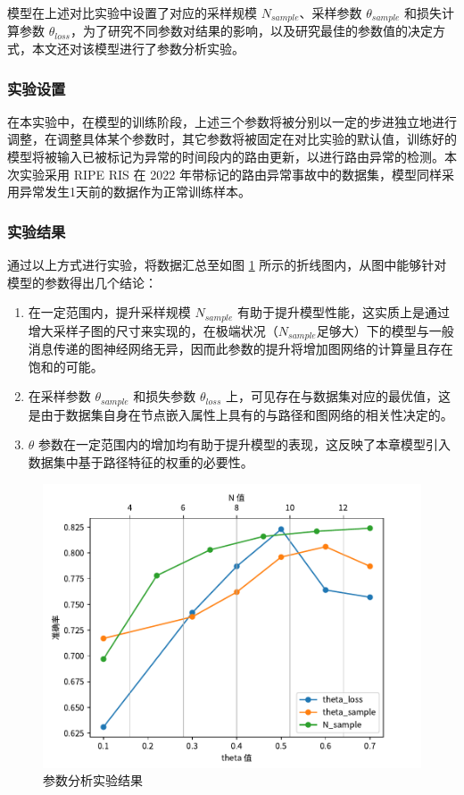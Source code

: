 模型在上述对比实验中设置了对应的采样规模 $N_{sample}$、采样参数 $\theta_{sample}$ 和损失计算参数 $\theta_{loss}$，为了研究不同参数对结果的影响，以及研究最佳的参数值的决定方式，本文还对该模型进行了参数分析实验。

\subsubsection{实验设置}

在本实验中，在模型的训练阶段，上述三个参数将被分别以一定的步进独立地进行调整，在调整具体某个参数时，其它参数将被固定在对比实验的默认值，训练好的模型将被输入已被标记为异常的时间段内的路由更新，以进行路由异常的检测。本次实验采用 RIPE RIS 在 2022 年带标记的路由异常事故中的数据集，模型同样采用异常发生1天前的数据作为正常训练样本。

\subsubsection{实验结果}

通过以上方式进行实验，将数据汇总至如图 \ref{c4_arg-result} 所示的折线图内，从图中能够针对模型的参数得出几个结论：

\begin{enumerate}
    \item 在一定范围内，提升采样规模 $N_{sample}$ 有助于提升模型性能，这实质上是通过增大采样子图的尺寸来实现的，在极端状况（$N_{sample}$足够大）下的模型与一般消息传递的图神经网络无异，因而此参数的提升将增加图网络的计算量且存在饱和的可能。
    \item 在采样参数 $\theta_{sample}$ 和损失参数 $\theta_{loss}$ 上，可见存在与数据集对应的最优值，这是由于数据集自身在节点嵌入属性上具有的与路径和图网络的相关性决定的。
    \item $\theta$ 参数在一定范围内的增加均有助于提升模型的表现，这反映了本章模型引入数据集中基于路径特征的权重的必要性。
\end{enumerate}

\begin{figure}[h]
    \includegraphics[width=0.9\linewidth]{chapter/c4_images/c4_arg-result.pdf}
    \caption{参数分析实验结果}
    \label{c4_arg-result}
\end{figure}

